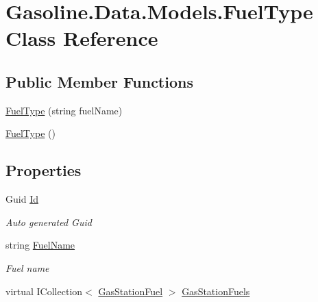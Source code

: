\hypertarget{class_gasoline_1_1_data_1_1_models_1_1_fuel_type}{}\section{Gasoline.\+Data.\+Models.\+Fuel\+Type Class Reference}
\label{class_gasoline_1_1_data_1_1_models_1_1_fuel_type}
\subsection*{Public Member Functions}
\begin{DoxyCompactItemize}
\item 
\mbox{\hyperlink{class_gasoline_1_1_data_1_1_models_1_1_fuel_type_adc0ac5250039050a7746110a85ffaebf}{Fuel\+Type}} (string fuel\+Name)
\item 
\mbox{\hyperlink{class_gasoline_1_1_data_1_1_models_1_1_fuel_type_ae2f8cb14cd2685f9e140ede7b9c8c910}{Fuel\+Type}} ()
\end{DoxyCompactItemize}
\subsection*{Properties}
\begin{DoxyCompactItemize}
\item 
Guid \mbox{\hyperlink{class_gasoline_1_1_data_1_1_models_1_1_fuel_type_a7a41f8fae4838bbaea573dba3094ab61}{Id}}
\begin{DoxyCompactList}\small\item\em Auto generated Guid \end{DoxyCompactList}\item 
string \mbox{\hyperlink{class_gasoline_1_1_data_1_1_models_1_1_fuel_type_aeb64372fcf61302d2618f5ee46ea6473}{Fuel\+Name}}
\begin{DoxyCompactList}\small\item\em Fuel name \end{DoxyCompactList}\item 
virtual I\+Collection$<$ \mbox{\hyperlink{class_gasoline_1_1_data_1_1_models_1_1_gas_station_fuel}{Gas\+Station\+Fuel}} $>$ \mbox{\hyperlink{class_gasoline_1_1_data_1_1_models_1_1_fuel_type_a3e843fd296e101d1776d5503d5f6c77d}{Gas\+Station\+Fuels}}
\end{DoxyCompactItemize}


